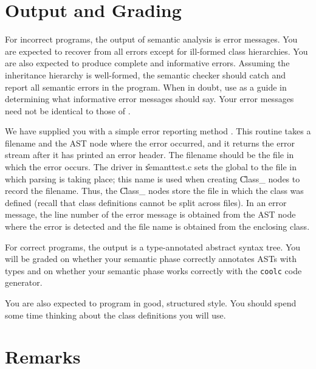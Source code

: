 \section{Output and Grading}

For incorrect programs, the output of semantic analysis is error
messages.  You are expected to recover from all errors except for
ill-formed class hierarchies.  You are also expected to produce
complete and informative errors.  Assuming the inheritance hierarchy
is well-formed, the semantic checker should catch and report all
semantic errors in the program.  When in doubt, use
 as a guide in determining what informative error messages
should say.  Your error messages need not be identical to those of
.

We have supplied you with a simple error reporting method
.  This routine takes a filename and the AST node where
the error occurred, and it returns the error stream after it has
printed an error header.  The filename should be the file in which the
error occurs.  The driver in \U{semanttest.c} sets the global
 to the file in which parsing is taking place; this
name is used when creating \U{Class\_} nodes to record the filename.
Thus, the \U{Class\_} nodes store the file in which the class was
defined (recall that class definitions cannot be split across files).
In an error message, the line number of the error message is obtained
from the AST node where the error is detected and the file name is
obtained from the enclosing class.

For correct programs, the output is a type-annotated abstract syntax
tree.  You will be graded on whether your semantic phase correctly
annotates ASTs with types and on whether your semantic phase works
correctly with the {\tt coolc} code generator.

You are also expected to program in good, structured style.  You
should spend some time thinking about the class definitions you will
use.

\section{Remarks}

